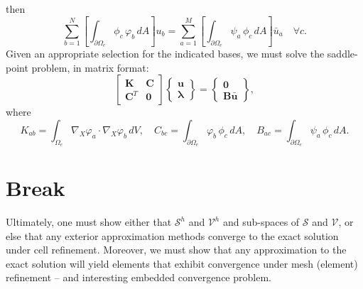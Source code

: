then
\begin{equation}
	\sum_{b=1}^N \left[ \int_{\partial \Omega_e} \phi_c \, \varphi_b \, dA \right] u_b = \sum_{a=1}^M \left[ \int_{\partial \Omega_e} \psi_a \, \phi_c \, dA \right] \bar{u}_a \quad \forall c.
\end{equation}
Given an appropriate selection for the indicated bases, we must solve the saddle-point problem, in matrix format:
\begin{equation}
	\left[ \begin{array}{cc} \mathbf{K} & \mathbf{C} \\ \mathbf{C}^T & \mathbf{0} \end{array} \right] \left\{ \begin{array}{c} \mathbf{u} \\ \boldsymbol{\lambda} \end{array} \right\} = \left\{ \begin{array}{c} \mathbf{0} \\ \mathbf{B} \bar{\mathbf{u}} \end{array} \right\},
\end{equation}
where
\begin{equation}
	K_{ab} = \int_{\Omega_e} \nabla_X \varphi_a \cdot \nabla_X \varphi_b \, dV, \quad C_{bc} = \int_{\partial \Omega_e} \varphi_b \, \phi_c \, dA, \quad B_{ac} = \int_{\partial \Omega_e} \psi_a \, \phi_c \, dA.
\end{equation}
	
\section{Break}
	
	Ultimately, one must show either that $\mathcal{S}^h$ and $\mathcal{V}^h$ and sub-spaces of $\mathcal{S}$ and $\mathcal{V}$, or else that any exterior approximation methods converge to the exact solution under cell refinement. Moreover, we must show that any approximation to the exact solution will yield elements that exhibit convergence under mesh (element) refinement -- and interesting embedded convergence problem.
		
			

